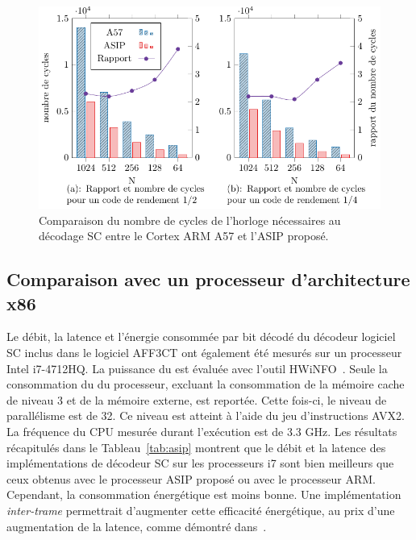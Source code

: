 \begin{figure}[htp]
\centering
\includegraphics{main/ch3_fig/curves/cycle_count/cycle_count}
\caption{Comparaison du nombre de cycles de l'horloge nécessaires au décodage SC entre le Cortex ARM A57 et l'ASIP proposé.}
\label{fig:cycle_count}
\end{figure}

\subsection{Comparaison avec un processeur d'architecture x86}
Le débit, la latence et l'énergie consommée par bit décodé du décodeur logiciel SC inclus dans le logiciel AFF3CT ont également été mesurés sur un processeur Intel i7-4712HQ.
La puissance du \coeur est évaluée avec l'outil HWiNFO~\cite{noauthor_hwinfo_nodate}. Seule la consommation du \coeur du processeur, excluant la consommation de la mémoire cache de niveau 3 et de la mémoire externe, est reportée. Cette fois-ci, le niveau de parallélisme est de 32. Ce niveau est atteint à l'aide du jeu d'instructions AVX2. La fréquence du CPU mesurée durant l'exécution est de 3.3 GHz. Les résultats récapitulés dans le Tableau~\ref{tab:asip} montrent que le débit et la latence des implémentations de décodeur SC sur les processeurs i7 sont bien meilleurs que ceux obtenus avec le processeur ASIP proposé ou avec le processeur ARM. Cependant, la consommation énergétique est moins bonne. Une implémentation \textit{inter-trame} permettrait d'augmenter cette efficacité énergétique, au prix d'une augmentation de la latence, comme démontré dans~\cite{cassagne_energy_2016}.


